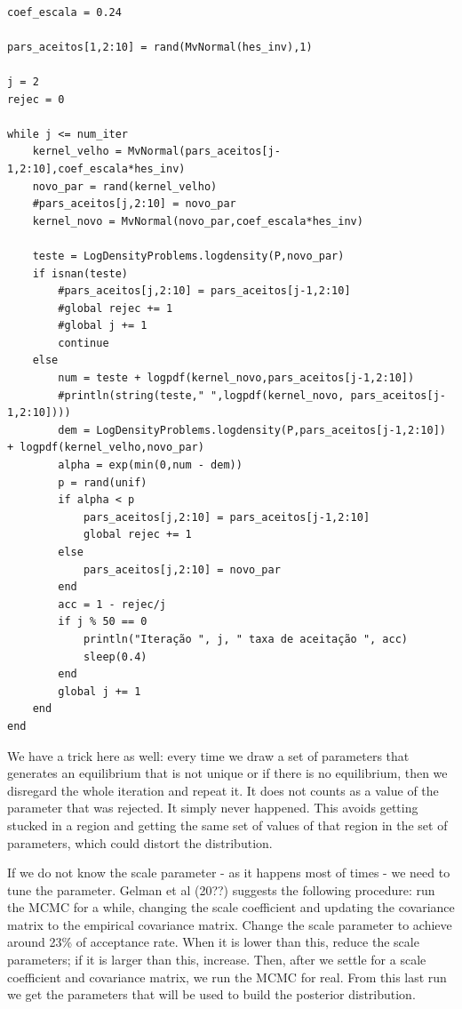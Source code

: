 \documentclass[12pt,a4paper]{article}
\begin{document}
\begin{verbatim}

coef_escala = 0.24

pars_aceitos[1,2:10] = rand(MvNormal(hes_inv),1)

j = 2
rejec = 0

while j <= num_iter
    kernel_velho = MvNormal(pars_aceitos[j-1,2:10],coef_escala*hes_inv)
    novo_par = rand(kernel_velho)
    #pars_aceitos[j,2:10] = novo_par
    kernel_novo = MvNormal(novo_par,coef_escala*hes_inv)

    teste = LogDensityProblems.logdensity(P,novo_par)
    if isnan(teste)
        #pars_aceitos[j,2:10] = pars_aceitos[j-1,2:10]
        #global rejec += 1
        #global j += 1
        continue
    else
        num = teste + logpdf(kernel_novo,pars_aceitos[j-1,2:10])
        #println(string(teste," ",logpdf(kernel_novo, pars_aceitos[j-1,2:10])))
        dem = LogDensityProblems.logdensity(P,pars_aceitos[j-1,2:10]) + logpdf(kernel_velho,novo_par)
        alpha = exp(min(0,num - dem))
        p = rand(unif)
        if alpha < p
            pars_aceitos[j,2:10] = pars_aceitos[j-1,2:10]
            global rejec += 1
        else
            pars_aceitos[j,2:10] = novo_par
        end
        acc = 1 - rejec/j
        if j % 50 == 0
            println("Iteração ", j, " taxa de aceitação ", acc)
            sleep(0.4)
        end
        global j += 1
    end
end

\end{verbatim}
We have a trick here as well: every time we draw a set of parameters that generates an equilibrium that is not unique or if there is no equilibrium, then we disregard the whole iteration and repeat it. It does not counts as a value of the parameter that was rejected. It simply never happened. This avoids getting stucked in a region and getting the same set of values of that region in the set of parameters, which could distort the distribution.

If we do not know the scale parameter - as it happens most of times - we need to tune the parameter. Gelman et al (20??) suggests the following procedure: run the MCMC for a while, changing the scale coefficient and updating the covariance matrix to the empirical covariance matrix. Change the scale parameter to achieve around 23\% of acceptance rate. When it is lower than this, reduce the scale parameters; if it is larger than this, increase. Then, after we settle for a scale coefficient and covariance matrix, we run the MCMC for real. From this last run we get the parameters that will be used to build the posterior distribution.
\end{document}
